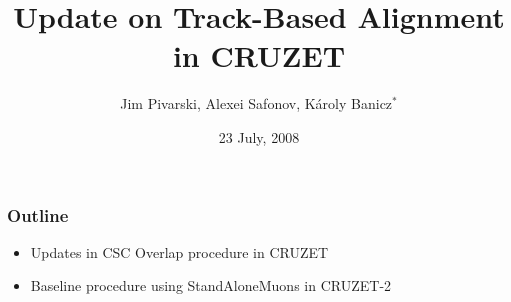\documentclass[compress]{beamer}
\title{Update on Track-Based Alignment in CRUZET}
\author{Jim Pivarski, Alexei Safonov, K\'aroly Banicz$^*$}
\institute{Texas A\&M University, $^*$US-CMS}
\date{23 July, 2008}
\begin{document}
\frame{\titlepage}


\begin{frame}
\frametitle{Outline}
\begin{itemize}\setlength{\itemsep}{0.75 cm}
\item Updates in CSC Overlap procedure in CRUZET
\item Baseline procedure using StandAloneMuons in CRUZET-2
\end{itemize}
\end{frame}

\end{document}
